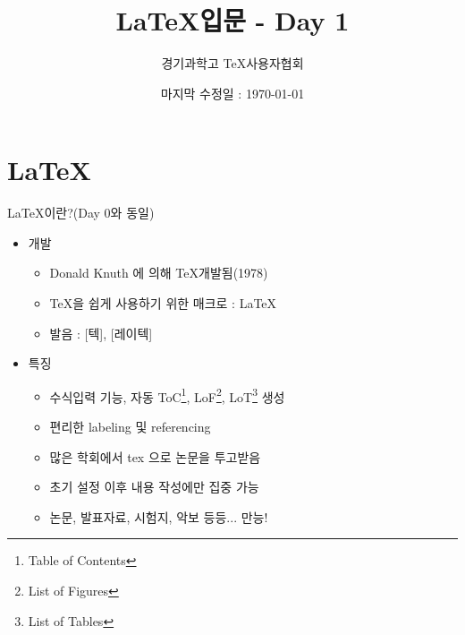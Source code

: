 \documentclass[12pt]{beamer}
\title[\LaTeX - Day 1]{\LaTeX 입문 - Day 1}
\author{경기과학고 \TeX 사용자협회}
\institute[GSHSTeXSociety]{\url{latex.gs.hs.kr}}
\date{마지막 수정일 : \today}
\begin{document}
\begin{frame}
\titlepage %
\end{frame}

\section{\LaTeX}
\begin{frame}{\LaTeX 이란?{\normalsize (Day 0와 동일)}}
	\begin{itemize}
		\item 개발
		\begin{itemize}
			\item Donald Knuth 에 의해 \TeX 개발됨(1978)
			\item \TeX 을 쉽게 사용하기 위한 매크로 : \LaTeX
			\item 발음 : [텍], [레이텍]
		\end{itemize}
		\item 특징
		\begin{itemize}
			\item 수식입력 기능, 자동 ToC\footnote{Table of Contents}, LoF\footnote{List of Figures}, LoT\footnote{List of Tables} 생성
			\item 편리한 labeling 및 referencing
			\item 많은 학회에서 tex 으로 논문을 투고받음
			\item 초기 설정 이후 내용 작성에만 집중 가능
			\item 논문, 발표자료, 시험지, 악보 등등... 만능!
		\end{itemize}
	\end{itemize}
\end{frame}
\end{document}

